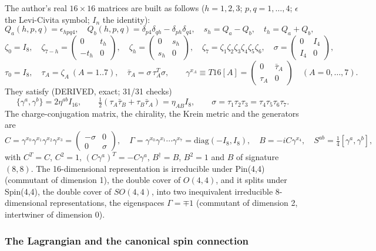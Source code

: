\documentclass[
  10pt,
]{article}
\begin{document}
The author's real \(16\times16\) matrices are built as follows
(\(h = 1, 2, 3\); \(p, q = 1, \dots, 4\); \(\epsilon\) the Levi-Civita
symbol; \(I_n\) the identity):
\[ Q_a(h,p,q) = \epsilon_{hpq4},\quad Q_b(h,p,q) = \delta_{p4}\delta_{qh} - \delta_{ph}\delta_{q4},\quad
   s_h = Q_a - Q_b,\quad t_h = Q_a + Q_b , \]
\[ \zeta_0 = I_8,\quad \zeta_{7-h} = \begin{pmatrix} 0 & t_h \\ -t_h & 0\end{pmatrix},\quad
   \zeta_h = \begin{pmatrix} 0 & s_h \\ s_h & 0\end{pmatrix},\quad \zeta_7 = \zeta_1\zeta_2\zeta_3\zeta_4\zeta_5\zeta_6,\quad
   \sigma = \begin{pmatrix} 0 & I_4 \\ I_4 & 0 \end{pmatrix}, \]
\[ \tau_0 = I_8,\quad \tau_A = \zeta_A\ (A = 1..7),\quad \bar\tau_A = \sigma\,\tau_A^{T}\sigma,\qquad
   \gamma^{x_A} \equiv T16[A] = \begin{pmatrix} 0 & \bar\tau_A \\ \tau_A & 0 \end{pmatrix}\quad (A = 0, \dots, 7). \]
They satisfy (DERIVED, exact; 31/31 checks)
\[ \{\gamma^a, \gamma^b\} = 2\eta^{ab} I_{16}, \qquad \tfrac12(\tau_A\bar\tau_B + \tau_B\bar\tau_A) = \eta_{AB}I_8,\qquad
   \sigma = \tau_1\tau_2\tau_3 = \tau_4\tau_5\tau_6\tau_7 . \] The
charge-conjugation matrix, the chirality, the Krein metric and the
generators are
\[ C = \gamma^{x_0}\gamma^{x_1}\gamma^{x_2}\gamma^{x_3} = \begin{pmatrix} -\sigma & 0 \\ 0 & \sigma\end{pmatrix},\quad
   \Gamma = \gamma^{x_0}\gamma^{x_1}\cdots\gamma^{x_7} = \mathrm{diag}(-I_8, I_8),\quad
   B = -iC\gamma^{x_4},\quad S^{ab} = \tfrac14[\gamma^a, \gamma^b], \]
with \(C^T = C\), \(C^2 = 1\), \((C\gamma^a)^T = -C\gamma^a\),
\(B^\dagger = B\), \(B^2 = 1\) and \(B\) of signature \((8,8)\). The
16-dimensional representation is irreducible under Pin(4,4) (commutant
of dimension 1), the double cover of \(O(4,4)\), and it splits under
Spin(4,4), the double cover of \(SO(4,4)\), into two inequivalent
irreducible 8-dimensional representations, the eigenspaces
\(\Gamma = \mp1\) (commutant of dimension 2, intertwiner of dimension
0).

\hypertarget{the-lagrangian-and-the-canonical-spin-connection}{%
\subsubsection{The Lagrangian and the canonical spin
connection}\label{the-lagrangian-and-the-canonical-spin-connection}}
\end{document}
